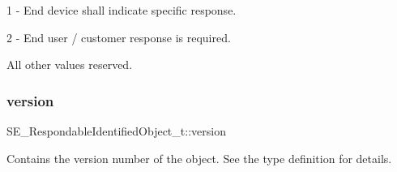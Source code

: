 1 -\/ End device shall indicate specific response.

2 -\/ End user / customer response is required.

All other values reserved. \mbox{\label{group__RespondableIdentifiedObject_ga0cd2bf56b9f373bbdf164c8819041c18}} 
\subsubsection{\texorpdfstring{version}{version}}
{\footnotesize\ttfamily S\+E\+\_\+\+Respondable\+Identified\+Object\+\_\+t\+::version}

Contains the version number of the object. See the type definition for details. 